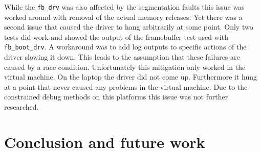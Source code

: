 \documentclass[
a4paper,
12pt,
notitlepage,
parskip=half,
DIV=11,
]{scrbook}
\begin{document}
		While the \texttt{fb\_drv} was also affected by the segmentation faults this issue was worked around with removal of the actual memory releases.
		Yet there was a second issue that caused the driver to hang arbitrarily at some point.
		Only two tests did work and showed the output of the framebuffer test used with \texttt{fb\_boot\_drv}.
		A workaround was to add log outputs to specific actions of the driver slowing it down.
		This leads to the assumption that these failures are caused by a race condition.
		Unfortunately this mitigation only worked in the virtual machine.
		On the laptop the driver did not come up.
		Furthermore it hung at a point that never caused any problems in the virtual machine.
		Due to the constrained debug methods on this platforms this issue was not further researched.
	
	\chapter{Conclusion and future work}
	
	
	
	
\end{document}
